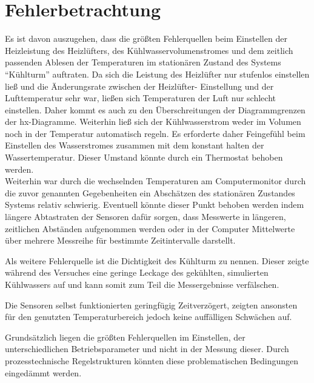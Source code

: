 \newpage
\section{Fehlerbetrachtung}
\label{sec:fehlec|}

Es ist davon auszugehen, dass die größten Fehlerquellen beim Einstellen der Heizleistung des Heizlüfters, des Kühlwasservolumenstromes und dem zeitlich passenden Ablesen der Temperaturen im stationären Zustand des Systems "`Kühlturm"' auftraten. Da sich die Leistung des Heizlüfter nur stufenlos einstellen ließ und die Änderungsrate zwischen der Heizlüfter- Einstellung und der Lufttemperatur sehr war, ließen sich Temperaturen der Luft nur schlecht einstellen. Daher kommt es auch zu den Überschreitungen der Diagrammgrenzen der hx-Diagramme. Weiterhin ließ sich der Kühlwasserstrom weder im Volumen noch in der Temperatur automatisch regeln. Es erforderte daher Feingefühl beim Einstellen des Wasserstromes zusammen mit dem konstant halten der Wassertemperatur. Dieser Umstand könnte durch ein Thermostat behoben werden.\\
 Weiterhin war durch die wechselnden Temperaturen am Computermonitor durch die zuvor genannten Gegebenheiten ein Abschätzen des stationären Zustandes Systems relativ schwierig. Eventuell könnte dieser Punkt behoben werden indem längere Abtastraten der Sensoren dafür sorgen, dass Messwerte in längeren, zeitlichen Abständen aufgenommen werden oder in der Computer Mittelwerte über mehrere Messreihe für bestimmte Zeitintervalle darstellt.

Als weitere Fehlerquelle ist die Dichtigkeit des Kühlturm zu nennen. Dieser zeigte während des Versuches eine geringe Leckage des gekühlten, simulierten Kühlwassers auf und kann somit zum Teil die Messergebnisse verfälschen.

Die Sensoren selbst funktionierten geringfügig Zeitverzögert, zeigten ansonsten für den genutzten Temperaturbereich jedoch keine auffälligen Schwächen auf.

Grundsätzlich liegen die größten Fehlerquellen im Einstellen, der unterschiedlichen Betriebsparameter und nicht in der Messung dieser. Durch prozesstechnische Regelstrukturen könnten diese problematischen Bedingungen eingedämmt werden.
